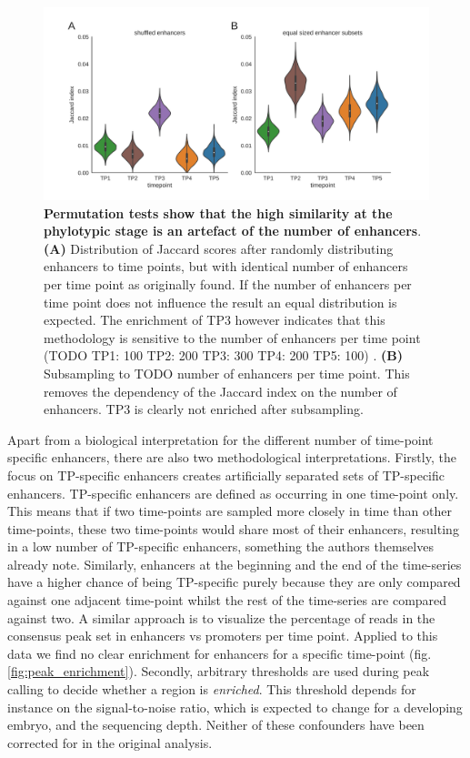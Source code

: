 \begin{figure}[H]
    \includegraphics[width=\linewidth]{ch.hourglass/images/fly_shuffle.png}
    \caption{\textbf{Permutation tests show that the high similarity at the phylotypic stage is an artefact of the number of enhancers}. \textbf{(A)} Distribution of Jaccard scores after randomly distributing enhancers to time points, but with identical number of enhancers per time point as originally found. If the number of enhancers per time point does not influence the result an equal distribution is expected. The enrichment of TP3 however indicates that this methodology is sensitive to the number of enhancers per time point (TODO TP1: 100 TP2: 200 TP3: 300 TP4: 200 TP5: 100) . \textbf{(B)} Subsampling to TODO number of enhancers per time point. This removes the dependency of the Jaccard index on the number of enhancers. TP3 is clearly not enriched after subsampling.}
    \label{fig:shuffle}
\end{figure}

Apart from a biological interpretation for the different number of time-point specific enhancers, there are also two methodological interpretations. Firstly, the focus on TP-specific enhancers creates artificially separated sets of TP-specific enhancers. TP-specific enhancers are defined as occurring in one time-point only. This means that if two time-points are sampled more closely in time than other time-points, these two time-points would share most of their enhancers, resulting in a low number of TP-specific enhancers, something the authors themselves already note. Similarly, enhancers at the beginning and the end of the time-series have a higher chance of being TP-specific purely because they are only compared against one adjacent time-point whilst the rest of the time-series are compared against two. A similar approach is to visualize the percentage of reads in the consensus peak set in enhancers vs promoters per time point. Applied to this data we find no clear enrichment for enhancers for a specific time-point (fig. \ref{fig:peak_enrichment}). Secondly, arbitrary thresholds are used during peak calling to decide whether a region is \textit{enriched}. This threshold depends for instance on the signal-to-noise ratio, which is expected to change for a developing embryo, and the sequencing depth\cite{encode_guidelines2012}. Neither of these confounders have been corrected for in the original analysis.

